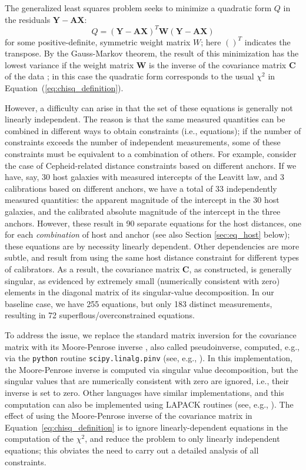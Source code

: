 The generalized least squares problem seeks to minimize a quadratic form $Q$ in the residuals $ \mathbf {Y - A X} $:
\begin{equation}
    Q = (\mathbf {Y-AX})^T \mathbf {W} (\mathbf {Y-AX})
\end{equation}
for some positive-definite, symmetric weight matrix $ W $; here $ ()^T $ indicates the transpose.  By the Gauss-Markov theorem, the result of this minimization has the lowest variance if the weight matrix $ \mathbf {W} $ is the inverse of the covariance matrix $ \mathbf C $ of the data \citep{aitken1935}; in this case the quadratic form corresponds to the usual $ \chi^2 $ in Equation~(\ref{eq:chisq_definition}).

However, a difficulty can arise in that the set of these equations is generally not linearly independent. The reason is that the same measured quantities can be combined in different ways to obtain constraints (i.e., equations); if the number of constraints exceeds the number of independent measurements, some of these constraints must be equivalent to a combination of others.  For example, consider the case of Cepheid-related distance constraints based on different anchors. If we have, say, 30 host galaxies with measured intercepts of the Leavitt law, and 3 calibrations based on different anchors, we have a total of 33 independently measured quantities: the apparent magnitude of the intercept in the 30 host galaxies, and the calibrated absolute magnitude of the intercept in the three anchors. However, these result in 90 separate equations for the host distances, one for each \textit{combination} of host and anchor (see also Section \ref{sec:eq_host} below); these equations are by necessity linearly dependent. Other dependencies are more subtle, and result from using the same host distance constraint for different types of calibrators. As a result, the covariance matrix $ \mathbf {C} $, as constructed, is generally singular, as evidenced by extremely small (numerically consistent with zero) elements in the diagonal matrix of its singular-value decomposition. In our baseline case, we have 255 equations, but only 183 distinct  measurements, resulting in 72 superflous/overconstrained equations.

To address the issue, we replace the standard matrix inversion for the covariance matrix with its Moore-Penrose inverse \citep{penrose1956}, also called pseudoinverse, computed, e.g., via the {\tt python} routine {\tt scipy.linalg.pinv} (see, e.g., \citealt{2022zndo....595738G}).  In this implementation, the Moore-Penrose inverse is computed via singular value decomposition, but the singular values that are numerically consistent with zero are ignored, i.e., their inverse is set to zero.  Other languages have similar implementations, and this computation can also be implemented using LAPACK routines (see, e.g., \citealt{2021ascl.soft04020L}). The effect of using the Moore-Penrose inverse of the covariance matrix in Equation~\ref{eq:chisq_definition} is to ignore linearly-dependent equations in the computation of the $ \chi^2 $, and reduce the problem to only linearly independent equations; this obviates the need to carry out a detailed analysis of all constraints. 

